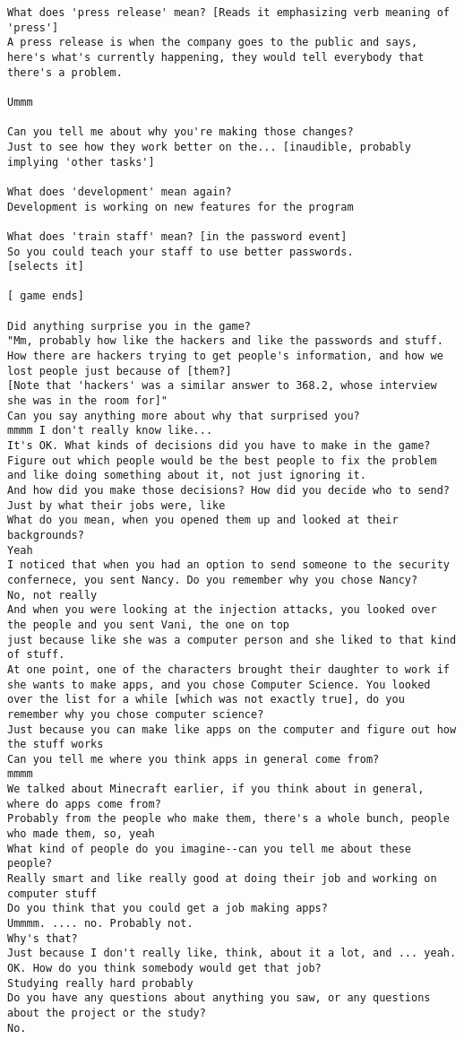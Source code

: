 \begin{lstlisting}
What does 'press release' mean? [Reads it emphasizing verb meaning of 'press']
A press release is when the company goes to the public and says, here's what's currently happening, they would tell everybody that there's a problem.

Ummm

Can you tell me about why you're making those changes?
Just to see how they work better on the... [inaudible, probably implying 'other tasks']

What does 'development' mean again?
Development is working on new features for the program

What does 'train staff' mean? [in the password event]
So you could teach your staff to use better passwords.
[selects it]

[ game ends]

Did anything surprise you in the game?
"Mm, probably how like the hackers and like the passwords and stuff. How there are hackers trying to get people's information, and how we lost people just because of [them?]
[Note that 'hackers' was a similar answer to 368.2, whose interview she was in the room for]"
Can you say anything more about why that surprised you?
mmmm I don't really know like...
It's OK. What kinds of decisions did you have to make in the game?
Figure out which people would be the best people to fix the problem and like doing something about it, not just ignoring it.
And how did you make those decisions? How did you decide who to send?
Just by what their jobs were, like 
What do you mean, when you opened them up and looked at their backgrounds?
Yeah
I noticed that when you had an option to send someone to the security confernece, you sent Nancy. Do you remember why you chose Nancy?
No, not really
And when you were looking at the injection attacks, you looked over the people and you sent Vani, the one on top
just because like she was a computer person and she liked to that kind of stuff.
At one point, one of the characters brought their daughter to work if she wants to make apps, and you chose Computer Science. You looked over the list for a while [which was not exactly true], do you remember why you chose computer science?
Just because you can make like apps on the computer and figure out how the stuff works
Can you tell me where you think apps in general come from?
mmmm
We talked about Minecraft earlier, if you think about in general, where do apps come from?
Probably from the people who make them, there's a whole bunch, people who made them, so, yeah
What kind of people do you imagine--can you tell me about these people?
Really smart and like really good at doing their job and working on computer stuff
Do you think that you could get a job making apps?
Ummmm. .... no. Probably not.
Why's that?
Just because I don't really like, think, about it a lot, and ... yeah.
OK. How do you think somebody would get that job?
Studying really hard probably
Do you have any questions about anything you saw, or any questions about the project or the study?
No.
\end{lstlisting}

